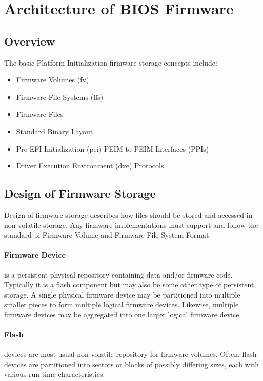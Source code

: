 \section{Architecture of BIOS Firmware}
\subsection{Overview}
The basic Platform Initialization firmware storage concepts include:
\begin{itemize}
	\item Firmware Volumes (\gls{fv})
	\item Firmware File Systems (\gls{ffs})
	\item Firmware Files
	\item Standard Binary Layout
	\item Pre-EFI Initialization (\gls{pei}) PEIM-to-PEIM Interfaces (PPIs)
	\item Driver Execution Environment (\gls{dxe}) Protocols
\end{itemize}

\subsection{Design of Firmware Storage}
Design of firmware storage describes how files should be stored and accessed in non-volatile storage. Any firmware implementations must support and follow the standard \gls{pi} Firmware Volume and Firmware File System Format.

\paragraph{Firmware Device} is a persistent physical repository containing data and/or firmware code. Typically it is a flash component but may also be some other type of persistent storage. A single physical firmware device may be partitioned into multiple smaller pieces to form multiple logical firmware devices. Likewise, multiple firmware devices may be aggregated into one larger logical firmware device.

\paragraph{Flash} devices are most usual non-volatile repository for firmware volumes. Often, flash devices are partitioned into sectors or blocks of possibly differing sizes, each with various run-time characteristics.

